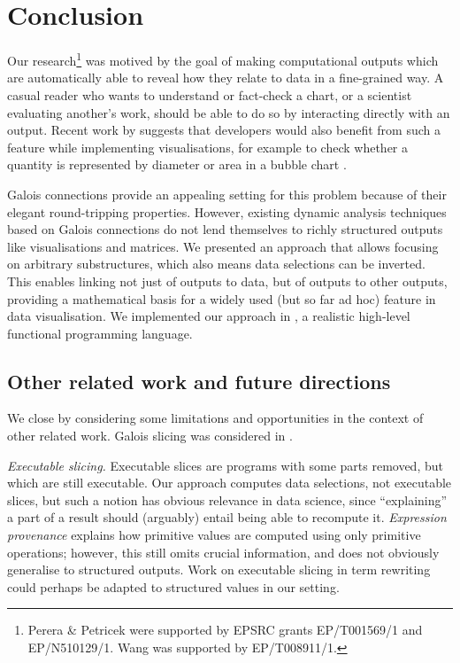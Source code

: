 \section{Conclusion}
\label{sec:conclusion}

Our research\footnote{Perera \& Petricek were supported by EPSRC grants EP/T001569/1 and EP/N510129/1. Wang was supported by EP/T008911/1.} was motived by the goal of making computational outputs which are automatically able to reveal how they relate to data in a fine-grained way. A casual reader who wants to understand or fact-check a chart, or a scientist evaluating another's work, should be able to do so by interacting directly with an output. Recent work by \citeauthor{walny19} suggests that developers would also benefit from such a feature while implementing visualisations, for example to check whether a quantity is represented by diameter or area in a bubble chart \cite{walny19}.

Galois connections provide an appealing setting for this problem because of their elegant round-tripping properties. However,  existing dynamic analysis techniques based on Galois connections do not lend themselves to richly structured outputs like visualisations and matrices. We presented an approach that allows focusing on arbitrary substructures, which also means data selections can be inverted. This enables linking not just of outputs to data, but of outputs to other outputs, providing a mathematical basis for a widely used (but so far ad hoc) feature in data visualisation. We implemented our approach in \href{https://github.com/explorable-viz/fluid}{\OurLanguage}, a realistic high-level functional programming language.

\subsection{Other related work and future directions}
\label{sec:conclusion:other-related-work}

We close by considering some limitations and opportunities in the context of other related work. Galois slicing \cite{perera12a,ricciotti17,perera16d} was considered in .

\emph{Executable slicing.} Executable slices \cite{hall95} are programs with some parts removed, but which are still executable. Our approach computes data selections, not executable slices, but such a notion has obvious relevance in data science, since ``explaining'' a part of a result should (arguably) entail being able to recompute it. \emph{Expression provenance} \cite{acar12} explains how primitive values are computed using only primitive operations; however, this still omits crucial information, and does not obviously generalise to structured outputs. Work on executable slicing in term rewriting \cite{field98} could perhaps be adapted to structured values in our setting.

